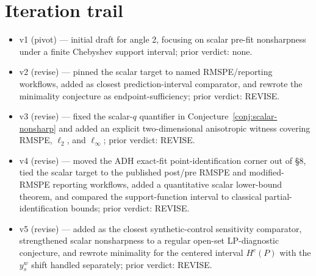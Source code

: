 \documentclass[11pt]{article}
\theoremstyle{definition}
\theoremstyle{plain}
\theoremstyle{remark}
\begin{document}
\section{Iteration trail}
\begin{itemize}[leftmargin=*]
\item v1 (pivot) --- initial draft for angle 2, focusing on scalar pre-fit nonsharpness under a finite Chebyshev support interval; prior verdict: none.
\item v2 (revise) --- pinned the scalar target to named RMSPE/reporting workflows, added \citet{CattaneoFengTitiunik2021} as closest prediction-interval comparator, and rewrote the minimality conjecture as endpoint-sufficiency; prior verdict: REVISE.
\item v3 (revise) --- fixed the scalar-\(q\) quantifier in Conjecture~\ref{conj:scalar-nonsharp} and added an explicit two-dimensional anisotropic witness covering RMSPE, \(\ell_2\), and \(\ell_\infty\); prior verdict: REVISE.
\item v4 (revise) --- moved the ADH exact-fit point-identification corner out of §8, tied the scalar target to the published post/pre RMSPE and modified-RMSPE reporting workflows, added a quantitative scalar lower-bound theorem, and compared the support-function interval to classical partial-identification bounds; prior verdict: REVISE.
\item v5 (revise) --- added \citet{ZeitlerVlontzosGilliganLee2023} as the closest synthetic-control sensitivity comparator, strengthened scalar nonsharpness to a regular open-set LP-diagnostic conjecture, and rewrote minimality for the centered interval \(H^c(P)\) with the \(y_s^w\) shift handled separately; prior verdict: REVISE.
\end{itemize}
\end{document}
